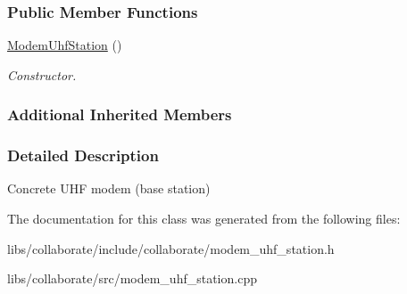 \subsubsection*{Public Member Functions}
\begin{DoxyCompactItemize}
\item 
\mbox{\label{classosse_1_1collaborate_1_1_modem_uhf_station_a26cc4da6ecf733547178400fbfaac340}} 
\hyperlink{classosse_1_1collaborate_1_1_modem_uhf_station_a26cc4da6ecf733547178400fbfaac340}{Modem\+Uhf\+Station} ()
\begin{DoxyCompactList}\small\item\em Constructor. \end{DoxyCompactList}\end{DoxyCompactItemize}
\subsubsection*{Additional Inherited Members}


\subsubsection{Detailed Description}
Concrete U\+HF modem (base station) 

The documentation for this class was generated from the following files\+:\begin{DoxyCompactItemize}
\item 
libs/collaborate/include/collaborate/modem\+\_\+uhf\+\_\+station.\+h\item 
libs/collaborate/src/modem\+\_\+uhf\+\_\+station.\+cpp\end{DoxyCompactItemize}
